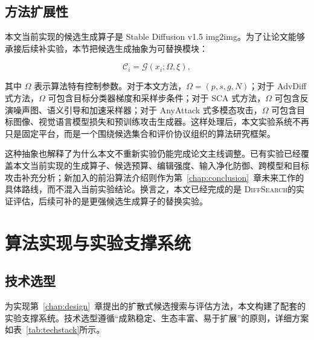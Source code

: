 \documentclass[type=bachelor,oneside]{fduthesis}
\newcommand{\methodname}{\textsc{DiffSearch}}
\begin{document}
\section{方法扩展性}

本文当前实现的候选生成算子是 Stable Diffusion v1.5 img2img。为了让论文能够承接后续补实验，本节把候选生成抽象为可替换模块：

\begin{equation}
  \mathcal{C}_i =
  \mathcal{G}(x_i;\Omega,\xi),
  \label{eq:generic_generator}
\end{equation}

其中 $\Omega$ 表示算法特有控制参数。对于本文方法，$\Omega=(p,s,g,N)$；对于 AdvDiff 式方法，$\Omega$ 可包含目标分类器梯度和采样步条件；对于 SCA 式方法，$\Omega$ 可包含反演噪声图、语义引导和加速采样器；对于 AnyAttack 式多模态攻击，$\Omega$ 可包含目标图像、视觉语言模型损失和预训练攻击生成器。这样处理后，本文实验系统不再只是固定平台，而是一个围绕候选集合和评价协议组织的算法研究框架。

这种抽象也解释了为什么本文不重新实验仍能完成论文主线调整。已有实验已经覆盖本文当前实现的生成算子、候选预算、编辑强度、输入净化防御、跨模型和目标攻击补充分析；新加入的前沿算法介绍则作为第~\ref{chap:conclusion}~章未来工作的具体路线，而不混入当前实验结论。换言之，本文已经完成的是 \methodname 的实证评估，后续可补的是更强候选生成算子的替换实验。

\chapter{算法实现与实验支撑系统}
\label{chap:impl}

\section{技术选型}

为实现第~\ref{chap:design}~章提出的扩散式候选搜索与评估方法，本文构建了配套的实验支撑系统。技术选型遵循“成熟稳定、生态丰富、易于扩展”的原则，详细方案如表~\ref{tab:techstack}所示。
\end{document}
